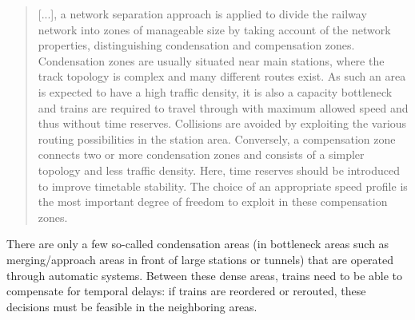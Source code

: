 \documentclass{article}
\begin{document}
%
\begin{quote}
    [...], a network separation approach is applied to divide the railway network into zones of manageable size by taking account of the network properties, distinguishing condensation and compensation zones. Condensation zones are usually situated near main stations, where the track topology is complex and many different routes exist. As such an area is expected to have a high traffic density, it is also a capacity bottleneck and trains are required to travel through with maximum allowed speed and thus without time reserves. Collisions are avoided by exploiting the various routing possibilities in the station area. Conversely, a compensation zone connects two or more condensation zones and consists of a simpler topology and less traffic density. Here, time reserves should be introduced to improve timetable stability. The choice of an appropriate speed profile is the most important degree of freedom to exploit in these compensation zones. \cite{caimi2009}
\end{quote}

 There are only a few so-called condensation areas \cite{caimi2009} (in bottleneck areas such as merging/approach areas in front of large stations or tunnels) that are operated through automatic systems. Between these dense areas, trains need to be able to compensate for temporal delays: if trains are reordered or rerouted, these decisions must be feasible in the neighboring areas.
\end{document}
